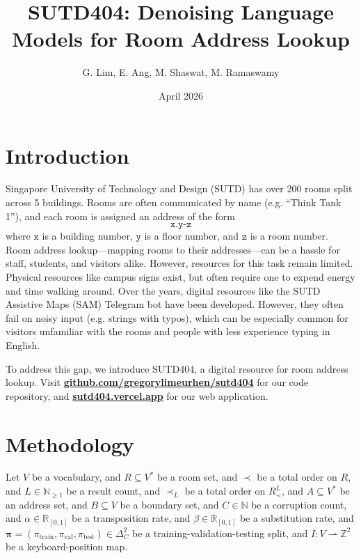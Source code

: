 \documentclass{article}
\title{SUTD404: Denoising Language Models for Room Address Lookup}
\author{
	G. Lim,
	E. Ang,
	M. Shaswat,
	M. Ramaswamy
}
\date{April 2026}
\theoremstyle{definition}
\let\oldhref\href
\renewcommand{\href}[2]{\oldhref{#1}{\textbf{#2}}}
\newcommand{\N}{\mathbb{N}}
\newcommand{\R}{\mathbb{R}}
\newcommand{\Z}{\mathbb{Z}}
\begin{document}
\maketitle

\section{Introduction}

Singapore University of Technology and Design (SUTD) has over 200 rooms split across 5 buildings.
Rooms are often communicated by name (e.g. ``Think Tank 1''),
and each room is assigned an address of the form
$$\texttt{x.y-z}$$
where $\texttt{x}$ is a building number,
$\texttt{y}$ is a floor number,
and $\texttt{z}$ is a room number.
Room address lookup---mapping rooms to their addresses---can be a hassle for staff, students, and visitors alike.
However, resources for this task remain limited.
Physical resources like campus signs exist,
but often require one to expend energy and time walking around.
Over the years,
digital resources like
the SUTD Assistive Maps (SAM) Telegram bot
\citep{sam}
have been developed.
However, they often fail on noisy input (e.g. strings with typos),
which can be especially common for
visitors unfamiliar with the rooms
and people with less experience typing in English.

To address this gap,
we introduce SUTD404,
a digital resource for room address lookup.
Visit
\href{https://github.com/gregorylimeurhen/sutd404}{github.com/gregorylimeurhen/sutd404}
for our code repository, and
\href{https://sutd404.vercel.app}{sutd404.vercel.app}
for our web application.

\newpage

\section{Methodology}


Let $V$ be a vocabulary,
and $R\subseteq V^{*}$ be a room set,
and $\prec$ be a total order on $R$,
and $L\in\N_{\geq 1}$ be a result count,
and $\prec_{L}$ be a total order on $R_{\prec}^{L}$,
and $A\subseteq V^{*}$ be an address set,
and $B\subseteq V$ be a boundary set,
and $C\in\N$ be a corruption count,
and $\alpha\in\R_{[0,1]}$ be a transposition rate,
and $\beta\in\R_{[0,1]}$ be a substitution rate,
and $\bm{\pi}=(\pi_\mathrm{train},\pi_\mathrm{val},\pi_\mathrm{test})\in\Delta_{C}^{2}$ be a training-validation-testing split,
and $I:V\rightharpoonup\Z^{2}$ be a keyboard-position map.
\end{document}
